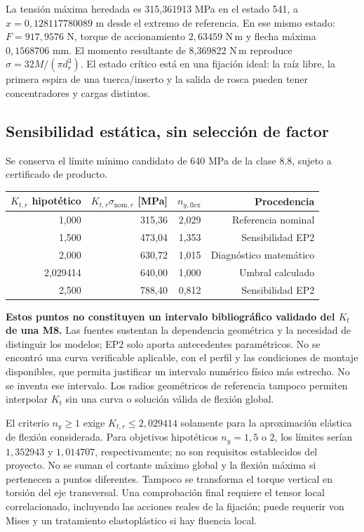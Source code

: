 La tensión máxima heredada es 315,361913 MPa en el estado 541, a
$x=0,128117780089$ m desde el extremo de referencia. En ese mismo estado:
$F=917,9576$ N, torque de accionamiento $2,63459$ N\,m y
flecha máxima $0,1568706$ mm. El momento resultante de 8,369822 N\,m
reproduce $\sigma=32M/(\pi d_r^3)$. El estado crítico está en una
fijación ideal: la raíz libre, la primera espira de una tuerca/inserto y
la salida de rosca pueden tener concentradores y cargas distintos.

\subsection{Sensibilidad estática, sin selección de factor}
Se conserva el límite mínimo candidato de 640 MPa de la clase 8.8,
sujeto a certificado de producto\cite{boellhoff_manual_8100_2023}.
\begin{center}
\begin{tabular}{rrrr}
\toprule
$K_{t,r}$ hipotético & $K_{t,r}\sigma_{\mathrm{nom},r}$ [MPa]
 & $n_{y,\mathrm{flex}}$ & Procedencia\\
\midrule
1,000 & 315,36 & 2,029 & Referencia nominal\\
1,500 & 473,04 & 1,353 & Sensibilidad EP2\\
2,000 & 630,72 & 1,015 & Diagnóstico matemático\\
2,029414 & 640,00 & 1,000 & Umbral calculado\\
2,500 & 788,40 & 0,812 & Sensibilidad EP2\\
\bottomrule
\end{tabular}
\end{center}
\textbf{Estos puntos no constituyen un intervalo bibliográfico validado
del $K_t$ de una M8.} Las fuentes sustentan la dependencia geométrica y
la necesidad de distinguir los modelos; EP2 solo aporta antecedentes
paramétricos. No se encontró una curva verificable aplicable, con el
perfil y las condiciones de montaje disponibles, que permita justificar
un intervalo numérico físico más estrecho. No se inventa ese intervalo.
Los radios geométricos de referencia tampoco permiten interpolar $K_t$
sin una curva o solución válida de flexión global.

El criterio $n_y\geq1$ exige $K_{t,r}\leq2,029414$ solamente para la
aproximación elástica de flexión considerada. Para objetivos hipotéticos
$n_y=1,5$ o $2$, los límites serían $1,352943$ y $1,014707$,
respectivamente; no son requisitos establecidos del proyecto.
No se suman el cortante máximo global y la flexión máxima si pertenecen
a puntos diferentes. Tampoco se transforma el torque vertical en torsión
del eje transversal. Una comprobación final requiere el tensor local
correlacionado, incluyendo las acciones reales de la fijación; puede
requerir von Mises y un tratamiento elastoplástico si hay fluencia local.

